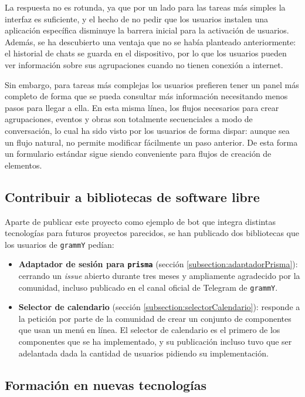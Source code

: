 La respuesta no es rotunda, ya que por un lado para las tareas más simples la interfaz es suficiente, y el hecho de no pedir que los usuarios instalen una aplicación específica disminuye la barrera inicial para la activación de usuarios. Además, se ha descubierto una ventaja que no se había planteado anteriormente: el historial de chats se guarda en el dispositivo, por lo que los usuarios pueden ver información sobre sus agrupaciones cuando no tienen conexión a internet.

Sin embargo, para tareas más complejas los usuarios prefieren tener un panel más completo de forma que se pueda consultar más información necesitando menos pasos para llegar a ella. En esta misma línea, los flujos necesarios para crear agrupaciones, eventos y obras son totalmente secuenciales a modo de conversación, lo cual ha sido visto por los usuarios de forma dispar: aunque sea un flujo natural, no permite modificar fácilmente un paso anterior. De esta forma un formulario estándar sigue siendo conveniente para flujos de creación de elementos.

\subsection{Contribuir a bibliotecas de software libre}

Aparte de publicar este proyecto como ejemplo de bot que integra distintas tecnologías para futuros proyectos parecidos, se han publicado dos bibliotecas que los usuarios de \texttt{grammY} pedían:

\begin{itemize}
    \item \textbf{Adaptador de sesión para \texttt{prisma}} (sección \ref{subsection:adaptadorPrisma}): cerrando un \textit{issue} abierto durante tres meses y ampliamente agradecido por la comunidad, incluso publicado en el canal oficial de Telegram de \texttt{grammY}.
    \item \textbf{Selector de calendario} (sección \ref{subsection:selectorCalendario}): responde a la petición por parte de la comunidad de crear un conjunto de componentes que usan un menú en línea. El selector de calendario es el primero de los componentes que se ha implementado, y su publicación incluso tuvo que ser adelantada dada la cantidad de usuarios pidiendo su implementación.
\end{itemize}


\subsection{Formación en nuevas tecnologías}

